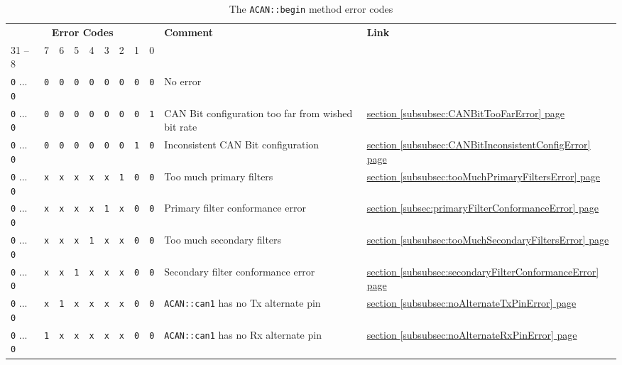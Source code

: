 \documentclass[10pt, a4paper, obeyspaces, openany]{extarticle}
\newcommand\refSubsectionPage[1]{\hyperref[subsec:#1]{section \ref*{subsec:#1} page \pageref{subsec:#1}}}
\newcommand\refSubsubsectionPage[1]{\hyperref[subsubsec:#1]{section \ref*{subsubsec:#1} page \pageref{subsubsec:#1}}}
\newcommand\labelTableau[1]{\label{tab:#1}}
\begin{document}
\begin{table}[!ht]
  \small
  \onehalfspacing
  \centering
  \begin{tabular}{lllllllllp{6cm}l}
    \multicolumn{9}{c}{\textbf{Error Codes}} & \textbf{Comment} & \textbf{Link}\\
    31 -- 8 & 7 & 6 & 5 & 4 & 3 & 2 & 1 & 0 & & \\
    \texttt{0} ...  \texttt{0} &\texttt{0} &\texttt{0} &\texttt{0} &\texttt{0} &\texttt{0} &\texttt{0} &\texttt{0} &\texttt{0} & No error & \\
    \texttt{0} ...  \texttt{0} &\texttt{0} &\texttt{0} &\texttt{0} &\texttt{0} &\texttt{0} &\texttt{0} &\texttt{0} &\texttt{1} & CAN Bit configuration too far from wished bit rate & \refSubsubsectionPage{CANBitTooFarError}\\
    \texttt{0} ...  \texttt{0} &\texttt{0} &\texttt{0} &\texttt{0} &\texttt{0} &\texttt{0} &\texttt{0} &\texttt{1} &\texttt{0} & Inconsistent CAN Bit configuration & \refSubsubsectionPage{CANBitInconsistentConfigError}\\
    \texttt{0} ...  \texttt{0} &\texttt{x}&\texttt{x} &\texttt{x} &\texttt{x} &\texttt{x} &\texttt{1} &\texttt{0} &\texttt{0} & Too much primary filters & \refSubsubsectionPage{tooMuchPrimaryFiltersError}\\
    \texttt{0} ...  \texttt{0} &\texttt{x} &\texttt{x} &\texttt{x} &\texttt{x} &\texttt{1} &\texttt{x} &\texttt{0} &\texttt{0} & Primary filter conformance error &  \refSubsectionPage{primaryFilterConformanceError}\\
    \texttt{0} ...  \texttt{0} &\texttt{x}&\texttt{x} &\texttt{x} &\texttt{1} &\texttt{x} &\texttt{x} &\texttt{0} &\texttt{0} & Too much secondary filters & \refSubsubsectionPage{tooMuchSecondaryFiltersError}\\
    \texttt{0} ...  \texttt{0} &\texttt{x}&\texttt{x} &\texttt{1} &\texttt{x} &\texttt{x} &\texttt{x} &\texttt{0} &\texttt{0} & Secondary filter conformance error &  \refSubsubsectionPage{secondaryFilterConformanceError}\\
    \texttt{0} ...  \texttt{0} &\texttt{x}&\texttt{1} &\texttt{x} &\texttt{x} &\texttt{x} &\texttt{x} &\texttt{0} &\texttt{0} & \texttt{ACAN::can1} has no Tx alternate pin & \refSubsubsectionPage{noAlternateTxPinError}\\
    \texttt{0} ...  \texttt{0} &\texttt{1}&\texttt{x} &\texttt{x} &\texttt{x} &\texttt{x} &\texttt{x} &\texttt{0} &\texttt{0} & \texttt{ACAN::can1} has no Rx alternate pin & \refSubsubsectionPage{noAlternateRxPinError} \\
  \end{tabular}
  \caption{The \texttt{ACAN::begin} method error codes}
  \labelTableau{beginErrorCode}
\end{table}
\end{document}
